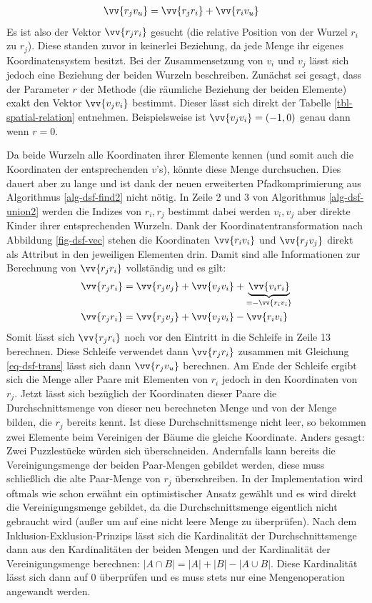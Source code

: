 \documentclass{whswinvcbook}
\begin{document}
\begin{align}\label{eq-dsf-trans}
    \vv{r_j v_u}&=\vv{r_j r_i}+\vv{r_i v_u}
\end{align}
Es ist also der Vektor $\vv{r_j r_i}$ gesucht (die relative Position von der Wurzel $r_i$ zu $r_j$). Diese standen zuvor in keinerlei Beziehung, da jede Menge ihr eigenes Koordinatensystem besitzt. Bei der Zusammensetzung von $v_i$ und $v_j$ lässt sich jedoch eine Beziehung der beiden Wurzeln beschreiben. Zunächst sei gesagt, dass der Parameter $r$ der Methode (die räumliche Beziehung der beiden Elemente) exakt den Vektor $\vv{v_j v_i}$ bestimmt. Dieser lässt sich direkt der Tabelle \ref{tbl-spatial-relation} entnehmen. Beispielsweise ist $\vv{v_j v_i}=(-1,0)$ genau dann wenn $r=0$.

Da beide Wurzeln alle Koordinaten ihrer Elemente kennen (und somit auch die Koordinaten der entsprechenden $v$'s), könnte diese Menge durchsuchen. Dies dauert aber zu lange und ist dank der neuen erweiterten Pfadkomprimierung aus Algorithmus \ref{alg-dsf-find2} nicht nötig. In Zeile 2 und 3 von Algorithmus \ref{alg-dsf-union2} werden die Indizes von $r_i,r_j$ bestimmt dabei werden $v_i,v_j$ aber direkte Kinder ihrer entsprechenden Wurzeln. Dank der Koordinatentransformation nach Abbildung \ref{fig-dsf-vec} stehen die Koordinaten $\vv{r_i v_i}$ und $\vv{r_j v_j}$ direkt als Attribut in den jeweiligen Elementen drin. Damit sind alle Informationen zur Berechnung von $\vv{r_j r_i}$ vollständig und es gilt:
\begin{align}\label{eq-dsf-trans2}
    \vv{r_j r_i}&=\vv{r_j v_j}+\vv{v_j v_i}+\underbrace{\vv{v_i r_i}}_{=-\vv{r_i v_i}}\nonumber\\
    \vv{r_j r_i}&=\vv{r_j v_j}+\vv{v_j v_i}-\vv{r_i v_i}
\end{align}
Somit lässt sich $\vv{r_j r_i}$ noch vor den Eintritt in die Schleife in Zeile 13 berechnen. Diese Schleife verwendet dann $\vv{r_j r_i}$ zusammen mit Gleichung \ref{eq-dsf-trans} lässt sich dann $\vv{r_j v_u}$ berechnen. Am Ende der Schleife ergibt sich die Menge aller Paare mit Elementen von $r_i$ jedoch in den Koordinaten von $r_j$. Jetzt lässt sich bezüglich der Koordinaten dieser Paare die Durchschnittsmenge von dieser neu berechneten Menge und von der Menge bilden, die $r_j$ bereits kennt. Ist diese Durchschnittsmenge nicht leer, so bekommen zwei Elemente beim Vereinigen der Bäume die gleiche Koordinate. Anders gesagt: Zwei Puzzlestücke würden sich überschneiden. Andernfalls kann bereits die Vereinigungsmenge der beiden Paar-Mengen gebildet werden, diese muss schließlich die alte Paar-Menge von $r_j$ überschreiben. In der Implementation wird oftmals wie schon erwähnt ein optimistischer Ansatz gewählt und es wird direkt die Vereinigungsmenge gebildet, da die Durchschnittsmenge eigentlich nicht gebraucht wird (außer um auf eine nicht leere Menge zu überprüfen). Nach dem Inklusion-Exklusion-Prinzips lässt sich die Kardinalität der Durchschnittsmenge dann aus den Kardinalitäten der beiden Mengen und der Kardinalität der Vereinigungsmenge berechnen: $|A\cap B|=|A|+|B|-|A\cup B|$. Diese Kardinalität lässt sich dann auf $0$ überprüfen und es muss stets nur eine Mengenoperation angewandt werden.
\end{document}
